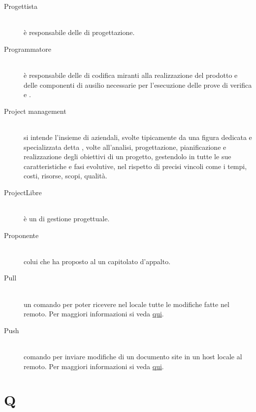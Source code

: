 \documentclass[12pt,a4paper]{article}
\begin{document}
\begin{description}
\item[Progettista] 
\hfill\\ è responsabile delle  di progettazione.

\item[Programmatore] 
\hfill\\ è responsabile delle  di codifica miranti alla realizzazione del prodotto e delle componenti di ausilio necessarie per l'esecuzione delle prove di verifica e .

\item[Project management] 
\hfill\\ si intende l'insieme di  aziendali, svolte tipicamente da una figura dedicata e specializzata detta , volte all'analisi, progettazione, pianificazione e realizzazione degli obiettivi di un progetto, gestendolo in tutte le sue caratteristiche e fasi evolutive, nel rispetto di precisi vincoli come i tempi, costi, risorse, scopi, qualità.

\item[ProjectLibre] 
\hfill\\ è un  di gestione progettuale.

\item[Proponente] 
\hfill\\ colui che ha proposto al  un capitolato d'appalto.

\item[Pull] 
\hfill\\ un comando  per poter ricevere nel locale tutte le modifiche fatte nel  remoto. Per maggiori informazioni si veda \href{https://git-scm.com/docs/}{qui}.

\item[Push] 
\hfill\\ comando  per inviare modifiche di un documento site in un host locale al  remoto. Per maggiori informazioni si veda \href{https://git-scm.com/docs/}{qui}.
\end{description}

\newpage

\section{Q}
\end{document}
